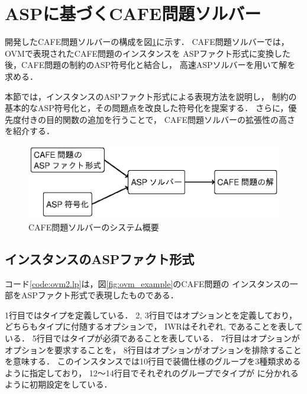 \section{ASPに基づくCAFE問題ソルバー}

開発したCAFE問題ソルバーの構成を図\ref{fig:system}に示す．
CAFE問題ソルバーでは，OVMで表現されたCAFE問題のインスタンスを
ASPファクト形式に変換した後，CAFE問題の制約のASP符号化と結合し，
高速ASPソルバーを用いて解を求める．

本節では，インスタンスのASPファクト形式による表現方法を説明し，
制約の基本的なASP符号化と，その問題点を改良した符号化を提案する．
さらに，優先度付きの目的関数の追加を行うことで，
CAFE問題ソルバーの拡張性の高さを紹介する．

\begin{figure}[tb]
 \includegraphics [width=\linewidth]{images/system.eps}
 \caption{CAFE問題ソルバーのシステム概要}
 \label{fig:system}
\end{figure}

\subsection{インスタンスのASPファクト形式}
 

コード\ref{code:ovm2.lp}は，図\ref{fig:ovm_example}のCAFE問題の
インスタンスの一部をASPファクト形式で表現したものである．

1行目ではタイプを定義している．
2, 3行目ではオプションとを定義しており，
どちらもタイプに付随するオプションで，
IWRはそれぞれ, であることを表している．
5行目ではタイプが必須であることを表している．
7行目はオプションがオプションを要求することを，
8行目はオプションがオプションを排除することを意味する．
このインスタンスでは10行目で装備仕様のグループを3種類求めるように指定しており，
12〜14行目でそれぞれのグループでタイプが
に分かれるように初期設定をしている．

